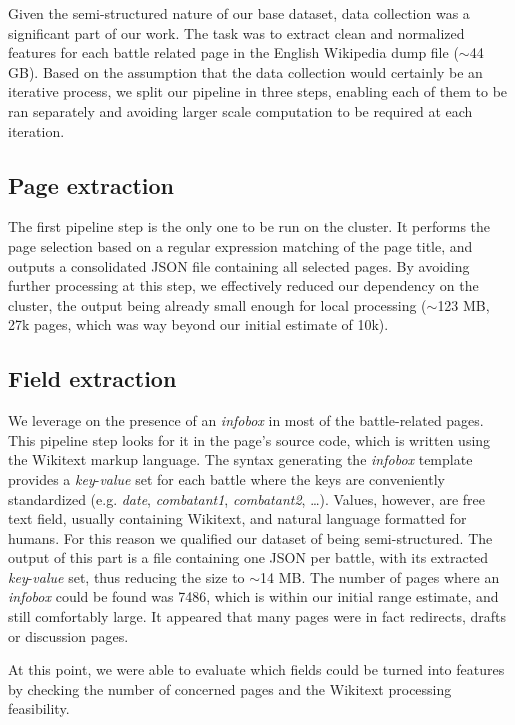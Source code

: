 Given the semi-structured nature of our base dataset, data collection was a significant part of our work. The task was to extract clean and normalized features for each battle related page in the English Wikipedia dump file ($\sim $44 GB). Based on the assumption that the data collection would certainly be an iterative process, we split our pipeline in three steps, enabling each of them to be ran separately and avoiding larger scale computation to be required at each iteration.

\subsection{Page extraction}
The first pipeline step is the only one to be run on the cluster. It performs the page selection based on a regular expression matching of the page title, and outputs a consolidated JSON file containing all selected pages. By avoiding further processing at this step, we effectively reduced our dependency on the cluster, the output being already small enough for local processing ($\sim $123 MB, 27k pages, which was way beyond our initial estimate of 10k).

\subsection{Field extraction}
We leverage on the presence of an \textit{infobox} in most of the battle-related pages. This pipeline step looks for it in the page's source code, which is written using the Wikitext\cite{wikitext} markup language. The syntax generating the \textit{infobox} template\cite{template} provides a \textit{key}-\textit{value} set for each battle where the keys are conveniently standardized (e.g. \textit{date}, \textit{combatant1}, \textit{combatant2}, \dots).   Values, however, are free text field, usually containing Wikitext, and natural language formatted for humans. For this reason we qualified our dataset of being semi-structured. The output of this part is a file containing one JSON per battle, with its extracted \textit{key}-\textit{value} set, thus reducing the size to $\sim $14 MB. The number of pages where an \textit{infobox} could be found was 7486, which is within our initial range estimate, and still comfortably large. It appeared that many pages were in fact redirects, drafts or discussion pages.  

At this point, we were able to evaluate which fields could be turned into features by checking the number of concerned pages and the Wikitext processing feasibility. 

